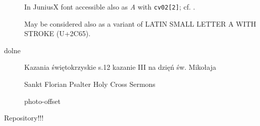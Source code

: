 \documentclass{article}
\begin{document}
\begin{description}
  In JuniusX font accessible also as \textit{A} with \texttt{cv02[2]};
  cf. \autocite[p. 7]{baker20:_opent_featur_junius_junius}.

  May be considered also as a variant of LATIN SMALL LETTER A WITH
  STROKE (U+2C65).
\item[dolne]
  Kazania świętokrzyskie
s.12 kazanie III na dzięń św. Mikołaja

Sankt Florian Psalter Holy Cross Sermons

  \cite{vrtel-wierczyński50:_wybór} photo-offset

\end{description}

\autocite{wydra14:_oldes_extan_prose_text_polis}

Repository!!!
\printbibliography
\end{document}
